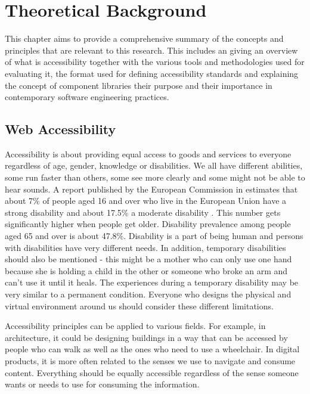 \documentclass{master_thesis}
\begin{document}
\section{Theoretical Background}

This chapter aims to provide a comprehensive summary of the concepts and principles that are relevant to this research. This includes
an giving an overview of what is accessibility together with the various tools and methodologies used for evaluating it, the format used for defining accessibility standards and explaining the concept of component libraries their purpose and their importance in contemporary software engineering practices.

\subsection{Web Accessibility}

Accessibility is about providing equal access to goods and services to everyone regardless of age, gender, knowledge or disabilities. We all have different abilities, some run faster than others, some see more clearly and some might not be able to hear sounds. A report published by the European Commission in \citeyear{Grammenos2020} estimates that about 7\% of people aged 16 and over who live in the European Union have a strong disability and about 17.5\% a moderate disability \citep{Grammenos2020}. This number gets significantly higher when people get older. Disability prevalence among people aged 65 and over is about 47.8\%.  Disability is a part of being human and persons with disabilities have very different needs. In addition, temporary disabilities should also be mentioned - this might be a mother who can only use one hand because she is holding a child in the other or someone who broke an arm and can't use it until it heals. The experiences during a temporary disability may be very similar to a permanent condition. Everyone who designs the physical and virtual environment around us should consider these different limitations.

Accessibility principles can be applied to various fields. For example, in architecture, it could be designing buildings in a way that can be accessed by people who can walk as well as the ones who need to use a wheelchair. In digital products, it is more often related to the senses we use to navigate and consume content. Everything should be equally accessible regardless of the sense someone wants or needs to use for consuming the information.
\end{document}
